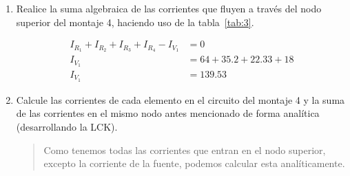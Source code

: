 \documentclass{article}
\begin{document}
\begin{enumerate}[label=\alph*.-]
\begin{quote}
            Note que es muy sencillo conocer el voltaje de todas las resistencias: debe ser~\SI{8}{\volt}, pues las resistencias están en paralelo a la fuente de dicho valor.

            Así pues:

            \begin{align*}
                -I_{V_1} + I_{R_1} + I_{R_2} + I_{R_3} + I_{R_4} &= 0\\
                -I_{V_1} + \frac{V_1}{R_1} + \frac{V_1}{R_2} + \frac{V_1}{R_3} + \frac{V_1}{R_4} &= 0\\
                -I_{V_1} + V_1\left(\frac{1}{R_1} + \frac{1}{R_2} + \frac{1}{R_3} + \frac{1}{R_4}\right) &= 0\\
                I_{V_1} &= 8\left(\frac{1}{120} + \frac{1}{220} + \frac{1}{330} + \frac{1}{470}\right)\\
                I_{V_1} &= 0.06667 + 0.03636 + 0.02424 + 0.01702\\
                I_{V_1} &= 0.14429\\
            \end{align*}

            Por lo que sabemos que la corriente en la fuente es \SI{144.29}{\milli\ampere}. Y en las resistencias $R_1$, $R_2$, $R_3$ y $R_4$ es aproximadamente \SI{66.67}{\milli\ampere}, \SI{36.36}{\milli\ampere}, \SI{24.24}{\milli\ampere} y \SI{17.02}{\milli\ampere} respectivamente.
        \end{quote}
        
        \item Realice la suma algebraica de las corrientes que fluyen a través del nodo superior del montaje 4, haciendo uso de la tabla~\ref{tab:3}.
        
        \begin{align*}
            I_{R_1} + I_{R_2} + I_{R_3} + I_{R_4} - I_{V_1} &= 0\\
            I_{V_1} &= 64 + 35.2 + 22.33 + 18 \\
            I_{V_1} &= 139.53
        \end{align*}
        
        \item Calcule las corrientes de cada elemento en el circuito del montaje 4 y la suma de las corrientes en el mismo nodo antes mencionado de forma analítica (desarrollando la LCK).
        
        \begin{quote}
            Como tenemos todas las corrientes que entran en el nodo superior, excepto la corriente de la fuente, podemos calcular esta analíticamente.


\end{quote}
\end{enumerate}
\end{document}
